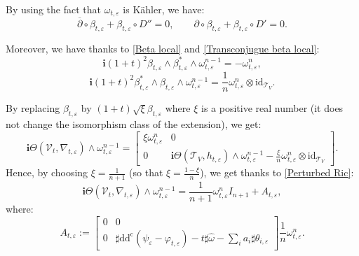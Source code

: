 \documentclass[12pt,a4paper]{amsart}
\newcommand{\id}{\mathrm{id}}
\newcommand{\ddc}{\mathrm{dd^c}}
\theoremstyle{plain}
\theoremstyle{definition}
\begin{document}
By using the fact that $\omega_{t, \varepsilon}$ is K\"ahler, we have:
\begin{equation}
    \overline{\partial} \circ \beta_{t, \varepsilon} + \beta_{t, \varepsilon} \circ D'' = 0, \qquad
    \partial \circ \beta_{t, \varepsilon} + \beta_{t, \varepsilon} \circ D' = 0.
\end{equation} 

Moreover, we have thanks to \eqref{Beta local} and \eqref{Transconjugue beta local}:
\begin{equation}
    \textbf{i} (1+t)^2 \beta_{t, \varepsilon} \wedge \beta_{t, \varepsilon}^* \wedge \omega_{t, \varepsilon}^{n-1} = -\omega_{t, \varepsilon}^{n},
\end{equation}
\begin{equation}
    \textbf{i} (1+t)^2 \beta_{t, \varepsilon}^* \wedge \beta_{t, \varepsilon} \wedge \omega_{t, \varepsilon}^{n-1} = \frac{1}{n}\omega_{t, \varepsilon}^{n} \otimes \id_{\mathcal{T}_{V}}.
\end{equation}


By replacing $\beta_{t, \varepsilon}$ by $(1+t)\sqrt{\xi}\beta_{t, \varepsilon}$ where $\xi$ is a positive real number (it does not change the isomorphism class of the extension), we get:
\begin{equation}
    \textbf{i}\Theta(\mathcal{V}_t, \nabla_{t, \varepsilon}) \wedge \omega_{t, \varepsilon}^{n-1} = 
    \begin{bmatrix}
        \xi \omega_{t, \varepsilon}^n & 0 \\
        0 & \textbf{i}\Theta(\mathcal{T}_V, h_{t, \varepsilon}) \wedge \omega_{t, \varepsilon}^{n-1} - \frac{\xi}{n} \omega_{t, \varepsilon}^{n} \otimes \id_{\mathcal{T}_V}
    \end{bmatrix}.
\end{equation}
Hence, by choosing $\xi = \frac{1}{n+1}$ (so that $\xi = \frac{1 - \xi}{n}$), we get thanks to \eqref{Perturbed Ric}:
\begin{equation}
    \textbf{i}\Theta(\mathcal{V}_t, \nabla_{t, \varepsilon}) \wedge \omega_{t, \varepsilon}^{n-1} = \frac{1}{n+1} \omega_{t, \varepsilon}^n I_{n+1} + A_{t, \varepsilon},
\end{equation}
where:
$$ 
A_{t, \varepsilon} :=
\begin{bmatrix}
    0 & 0 \\
    0 & \sharp \ddc (\psi_\varepsilon - \varphi_{t, \varepsilon}) - t\sharp \widehat{\omega} - \sum_i a_i \sharp \theta_{i, \varepsilon}
\end{bmatrix}
\frac{1}{n}\omega_{t, \varepsilon}^n.
$$
\end{document}
